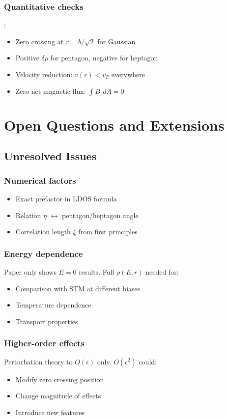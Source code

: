 \documentclass[12pt]{article}
\begin{document}
\subsubsection{Quantitative checks}:
\begin{itemize}
    \item[\checkmark] Zero crossing at $r = b/\sqrt{2}$ for Gaussian
    \item[\checkmark] Positive $\delta\rho$ for pentagon, negative for heptagon
    \item[\checkmark] Velocity reduction: $v(r) < v_F$ everywhere
    \item[\checkmark] Zero net magnetic flux: $\int B_z dA = 0$
\end{itemize}

\section{Open Questions and Extensions}

\subsection{Unresolved Issues}

\subsubsection{Numerical factors}
\begin{itemize}
    \item Exact prefactor in LDOS formula
    \item Relation $\eta$ $\leftrightarrow$ pentagon/heptagon angle
    \item Correlation length $\xi$ from first principles
\end{itemize}

\subsubsection{Energy dependence}
Paper only shows $E=0$ results. Full $\rho(E,r)$ needed for:
\begin{itemize}
    \item Comparison with STM at different biases
    \item Temperature dependence
    \item Transport properties
\end{itemize}

\subsubsection{Higher-order effects}
Perturbation theory to $O(\epsilon)$ only. $O(\epsilon^2)$ could:
\begin{itemize}
    \item Modify zero crossing position
    \item Change magnitude of effects
    \item Introduce new features
\end{itemize}
\end{document}

